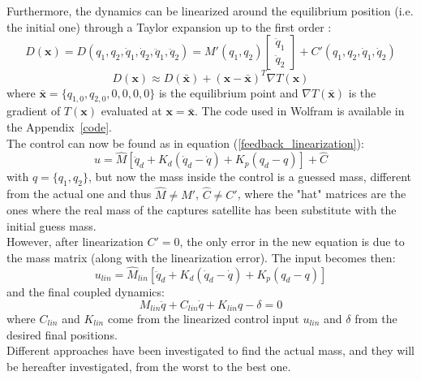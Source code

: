 \documentclass[a4paper,12pt,oneside]{report}
\begin{document}
Furthermore, the dynamics can be linearized around the equilibrium position (i.e. the initial one) through a Taylor expansion up to the first order \cite{twentyone}:
\begin{equation}
  D(\textbf{x})=D(q_1,q_2,\dot{q}_1,\dot{q}_2,\ddot{q}_1,\ddot{q}_2)=M'(q_1,q_2)\begin{bmatrix}
    \ddot{q}_1\\
    \ddot{q}_2
  \end{bmatrix}+C'(q_1,q_2,\dot{q}_1,\dot{q}_2)
\end{equation}
\begin{equation}
  D(\textbf{x})\approx D(\bar{\textbf{x}})+(\textbf{x}-\bar{\textbf{x}})^T\nabla T(\textbf{x})
\end{equation}
where $\bar{\textbf{x}}=\{q_{1,0},q_{2,0},0,0,0,0\}$ is the equilibrium point and $\nabla T(\bar{\textbf{x}})$ is the gradient of $T(\textbf{x})$ evaluated at $\textbf{x}=\bar{\textbf{x}}$. The code used in Wolfram is available in the Appendix~\ref{code}.\\
The control can now be found as in equation (\ref{feedback_linearization}):
\begin{equation}
  u=\hat{M}[\ddot{q}_d+K_d(\dot{q}_d-\dot{q})+K_p(q_d-q)]+\hat{C}
\end{equation}
with $q=\{q_1,q_2\}$, but now the mass inside the control is a guessed mass, different from the actual one and thus $\hat{M}\neq M'$, $\hat{C}\neq C'$, where the "hat" matrices are the ones where the real mass of the captures satellite has been substitute with the initial guess mass.\\
However, after linearization $C'=0$, the only error in the new equation is due to the mass matrix (along with the linearization error). The input becomes then:
\begin{equation}
  u_{lin}=\hat{M}_{lin}[\ddot{q}_d+K_d(\dot{q}_d-\dot{q})+K_p(q_d-q)]
\end{equation}
and the final coupled dynamics:
\begin{equation}
  M_{lin}\ddot{q}+C_{lin}\dot{q}+K_{lin}q-\delta=0
\end{equation}
where $C_{lin}$ and $K_{lin}$ come from the linearized control input $u_{lin}$ and $\delta$ from the desired final positions.\\
Different approaches have been investigated to find the actual mass, and they will be hereafter investigated, from the worst to the best one.
\newpage
\end{document}
